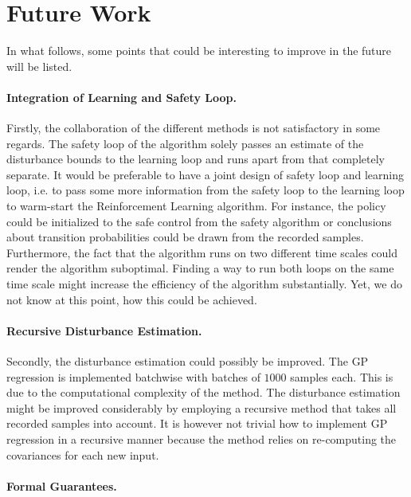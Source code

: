 \documentclass[../main.tex]{subfiles}
\begin{document}
\section{Future Work}

In what follows, some points that could be interesting to improve in the future will be listed. \par

\paragraph{Integration of Learning and Safety Loop.} Firstly, the collaboration of the different methods is not satisfactory in some regards. The safety loop of the algorithm solely passes an estimate of the disturbance bounds to the learning loop and runs apart from that completely separate. It would be preferable to have a joint design of safety loop and learning loop, i.e. to pass some more information from the safety loop to the learning loop to warm-start the Reinforcement Learning algorithm. For instance, the policy could be initialized to the safe control from the safety algorithm or conclusions about transition probabilities could be drawn from the recorded samples. Furthermore, the fact that the algorithm runs on two different time scales could render the algorithm suboptimal. Finding a way to run both loops on the same time scale might increase the efficiency of the algorithm substantially. Yet, we do not know at this point, how this could be achieved.\par
\paragraph{Recursive Disturbance Estimation.} Secondly, the disturbance estimation could possibly be improved. The GP regression is implemented batchwise with batches of $1000$ samples each. This is due to the computational complexity of the method. The disturbance estimation might be improved considerably by employing a recursive method that takes all recorded samples into account. It is however not trivial how to implement GP regression in a recursive manner because the method relies on re-computing the covariances for each new input.\par
\paragraph{Formal Guarantees.} 
\end{document}
